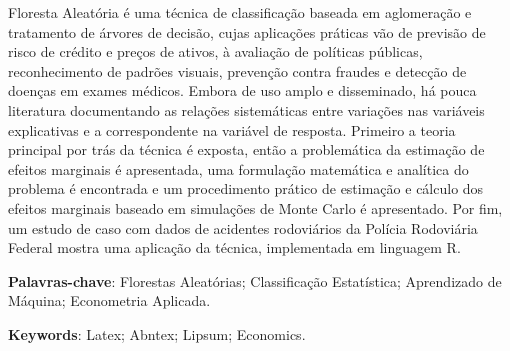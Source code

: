%
%

\begin{resumo}

Floresta Aleatória é uma técnica de classificação baseada em aglomeração e tratamento de árvores de decisão, cujas aplicações práticas vão de previsão de risco de crédito e preços de ativos, à avaliação de políticas públicas, reconhecimento de padrões visuais, prevenção contra fraudes e detecção de doenças em exames médicos. Embora de uso amplo e disseminado, há pouca literatura documentando as relações sistemáticas entre variações nas variáveis explicativas e a correspondente na variável de resposta. Primeiro a teoria principal por trás da técnica é exposta, então a problemática da estimação de efeitos marginais é apresentada, uma formulação matemática e analítica do problema é encontrada e um procedimento prático de estimação e cálculo dos efeitos marginais baseado em simulações de Monte Carlo é apresentado. Por fim, um estudo de caso com dados de acidentes rodoviários da Polícia Rodoviária Federal mostra uma aplicação da técnica, implementada em linguagem R. 


\textbf{Palavras-chave}: Florestas Aleatórias; Classificação Estatística; Aprendizado de Máquina; Econometria Aplicada. %
\end{resumo}


\begin{resumo}[ABSTRACT] %
	


\textbf{Keywords}: Latex; Abntex; Lipsum; Economics. 	
\end{resumo}



